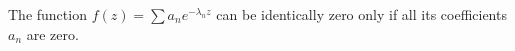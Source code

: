 The function $f(z) = \sum a_n e^{-\lambda_n z}$ can be identically zero only if all its coefficients $a_n$ are zero.
